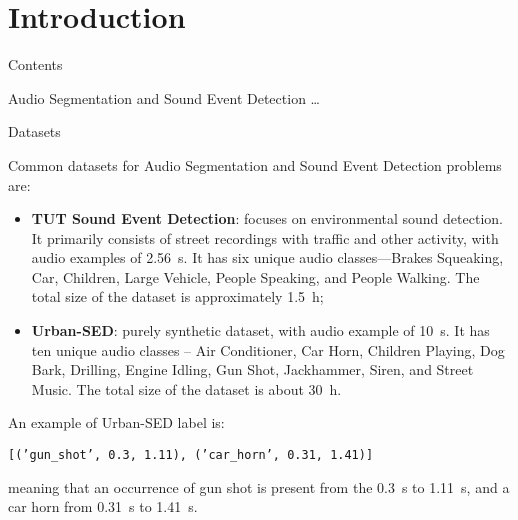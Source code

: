 

\section[Introduction]{Introduction}

	\begin{frame}{Contents}
			
		\tableofcontents
		
		\note{
			\dots			
		}		
		
	\end{frame}
	
	\begin{frame}{Audio Segmentation and Sound Event Detection}
		\dots		
		
		\note{
			\dots
		}
	\end{frame}
	
	\begin{frame}{Datasets}
	
		Common datasets for Audio Segmentation and Sound Event Detection problems are:
		
		\begin{itemize}
			\item \textbf{TUT Sound Event Detection}: focuses on environmental sound detection. It primarily consists of street recordings with traffic and other activity, with audio examples of \SI{2.56}{\second}. It has six unique audio classes—Brakes Squeaking, Car, Children, Large Vehicle, People Speaking, and People Walking. The total size of the dataset is approximately \SI{1.5}{\hour};
			\item \textbf{Urban-SED}: purely synthetic dataset, with audio example of \SI{10}{\second}. It has ten unique audio classes -- Air Conditioner, Car Horn, Children Playing, Dog Bark, Drilling, Engine Idling, Gun Shot, Jackhammer, Siren, and Street Music. The total size of the dataset is about \SI{30}{\hour}.
		\end{itemize}
		
		An example of Urban-SED label is:\\
		\centerline{\texttt{[('gun\_shot', 0.3, 1.11), ('car\_horn', 0.31, 1.41)]}}
		meaning that an occurrence of gun shot is present from the \SI{0.3}{\second} to \SI{1.11}{\second}, and a car horn from \SI{0.31}{\second} to \SI{1.41}{\second}.
		
		\note{
			\dots
		}
	\end{frame}
	
